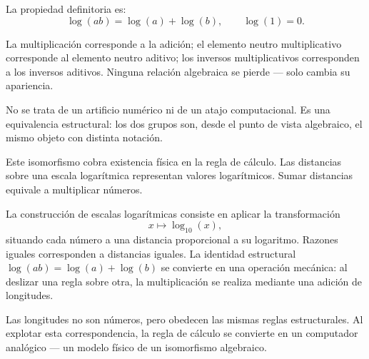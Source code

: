 \medskip

La propiedad definitoria es:
\[
\log(ab)=\log(a)+\log(b),
\qquad
\log(1)=0.
\]

La multiplicación corresponde a la adición; el elemento neutro multiplicativo
corresponde al elemento neutro aditivo; los inversos multiplicativos corresponden
a los inversos aditivos.
Ninguna relación algebraica se pierde --- solo cambia su apariencia.

\medskip

No se trata de un artificio numérico ni de un atajo computacional.
Es una equivalencia estructural: los dos grupos son, desde el punto de vista
algebraico, el mismo objeto con distinta notación.


\medskip

Este isomorfismo cobra existencia física en la regla de cálculo.
Las distancias sobre una escala logarítmica representan valores logarítmicos.
Sumar distancias equivale a multiplicar números.

\medskip

La construcción de escalas logarítmicas consiste en aplicar la transformación
\[
x \mapsto \log_{10}(x),
\]
situando cada número a una distancia proporcional a su logaritmo.
Razones iguales corresponden a distancias iguales.
La identidad estructural $\log(ab)=\log(a)+\log(b)$ se convierte en una
operación mecánica: al deslizar una regla sobre otra, la multiplicación se
realiza mediante una adición de longitudes.

\medskip

Las longitudes no son números, pero obedecen las mismas reglas estructurales.
Al explotar esta correspondencia, la regla de cálculo se convierte en un
computador analógico --- un modelo físico de un isomorfismo algebraico.



